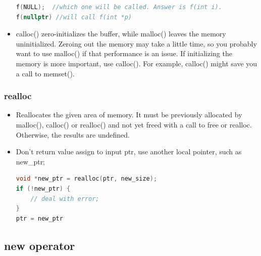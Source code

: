 \documentclass[a4paper,12pt,twoside]{book}
\begin{document}
\begin{itemize}
\begin{lstlisting}[frame=single, language=c++]
f(NULL);  //which one will be called. Answer is f(int i).
f(nullptr) //will call f(int *p)
\end{lstlisting}

\item calloc() zero-initializes the buffer, while malloc() leaves the memory uninitialized. Zeroing out the memory may take a little time, so you probably want to use malloc() if that performance is an issue. If initializing the memory is more important, use calloc(). For example, calloc() might save you a call to memset().
\end{itemize}

\subsubsection{realloc}
\begin{itemize}
	
\item Reallocates the given area of memory. It must be previously allocated by malloc(), calloc() or realloc() and not yet freed with a call to free or realloc. Otherwise, the results are undefined.


\item Don't return value assign to input ptr, use another local pointer, such as new\_ptr;
 \begin{lstlisting}[frame=single, language=c++]
void *new_ptr = realloc(ptr, new_size);
if (!new_ptr) {
    // deal with error;
}
ptr = new_ptr
\end{lstlisting}
\end{itemize}


\subsection{new operator}
\end{document}

